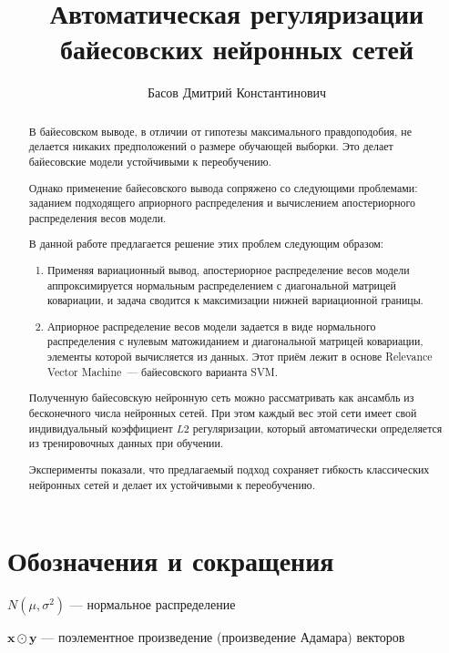 \documentclass{article}
\title{Автоматическая регуляризации байесовских нейронных сетей}
\author{
    Басов Дмитрий Константинович
}
\date{}
\begin{document}
\maketitle



\begin{abstract}
    В байесовском выводе, в отличии от гипотезы максимального правдоподобия,
    не делается никаких предположений о размере обучающей выборки.
    Это делает байесовские модели устойчивыми к переобучению.

    Однако применение байесовского вывода сопряжено со следующими проблемами:
    заданием подходящего априорного распределения и вычислением апостериорного распределения весов модели.

    В данной работе предлагается решение этих проблем следующим образом:
    \begin{enumerate}
        \item Применяя вариационный вывод,
            апостериорное распределение весов модели аппроксимируется
            нормальным распределением с диагональной матрицей ковариации,
            и задача сводится к максимизации нижней вариационной границы.
        \item Априорное распределение весов модели задается в виде
            нормального распределения с нулевым матожиданием
            и диагональной матрицей ковариации, элементы которой вычисляется из данных.
            Этот приём лежит в основе Relevance Vector Machine~--- байесовского варианта SVM.
    \end{enumerate}

    Полученную байесовскую нейронную сеть можно рассматривать как
    ансамбль из бесконечного числа нейронных сетей.
    При этом каждый вес этой сети имеет свой индивидуальный коэффициент $L2$ регуляризации,
    который автоматически определяется из тренировочных данных при обучении.

    Эксперименты показали,
    что предлагаемый подход сохраняет гибкость классических нейронных сетей
    и делает их устойчивыми к переобучению.

\end{abstract}


\section{Обозначения и сокращения}
$N(\mu, \sigma^2)$ --- нормальное распределение

$\pmb{x} \odot \pmb{y}$ --- поэлементное произведение (произведение Адамара) векторов
\end{document}
